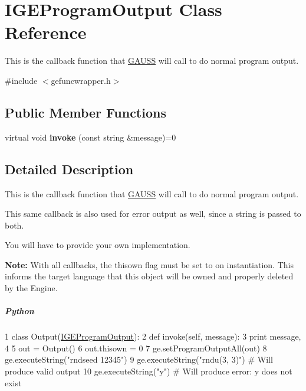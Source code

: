 \hypertarget{class_i_g_e_program_output}{\section{I\-G\-E\-Program\-Output Class Reference}
\label{class_i_g_e_program_output}
}


This is the callback function that \hyperlink{class_g_a_u_s_s}{G\-A\-U\-S\-S} will call to do normal program output.  




{\ttfamily \#include $<$gefuncwrapper.\-h$>$}

\subsection*{Public Member Functions}
\begin{DoxyCompactItemize}
\item 
\hypertarget{class_i_g_e_program_output_a04329081be6af1ccb5921dd74bf19fc5}{virtual void {\bfseries invoke} (const string \&message)=0}\label{class_i_g_e_program_output_a04329081be6af1ccb5921dd74bf19fc5}

\end{DoxyCompactItemize}


\subsection{Detailed Description}
This is the callback function that \hyperlink{class_g_a_u_s_s}{G\-A\-U\-S\-S} will call to do normal program output. 

This same callback is also used for error output as well, since a string is passed to both.

You will have to provide your own implementation.

{\bfseries Note\-:} With all callbacks, the {\ttfamily thisown} flag must be set to {} on instantiation. This informs the target language that this object will be owned and properly deleted by the Engine.

\subparagraph*{Python}


\begin{DoxyCode}
1 \textcolor{keyword}{class }Output(\hyperlink{class_i_g_e_program_output}{IGEProgramOutput}):
2     \textcolor{keyword}{def }invoke(self, message):
3         \textcolor{keywordflow}{print} message,
4 
5 out = Output()
6 out.thisown = 0
7 ge.setProgramOutputAll(out)
8 ge.executeString(\textcolor{stringliteral}{"rndseed 12345"})
9 ge.executeString(\textcolor{stringliteral}{"rndu(3, 3)"})  \textcolor{comment}{# Will produce valid output}
10 ge.executeString(\textcolor{stringliteral}{"y"})           \textcolor{comment}{# Will produce error: y does not exist}
\end{DoxyCode}


